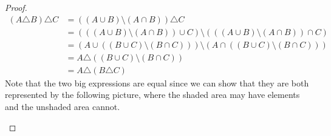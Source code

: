 \documentclass[../main.tex]{subfiles}
\begin{document}
\begin{enumerate}
\begin{proof}
        \begin{align*}
            (A\triangle B)\triangle C &= ((A\cup B)\setminus(A\cap B))\triangle C\\
            &= (((A\cup B)\setminus(A\cap B))\cup C)\setminus(((A\cup B)\setminus(A\cap B))\cap C)\\
            &= (A\cup((B\cup C)\setminus(B\cap C)))\setminus(A\cap((B\cup C)\setminus(B\cap C)))\\
            &= A\triangle((B\cup C)\setminus(B\cap C))\\
            &= A\triangle(B\triangle C)
        \end{align*}
        Note that the two big expressions are equal since we can show that they are both represented by the following picture, where the shaded area may have elements and the unshaded area cannot.
        \begin{figure}
            \centering
\end{figure}
\end{proof}
\end{enumerate}
\end{document}

